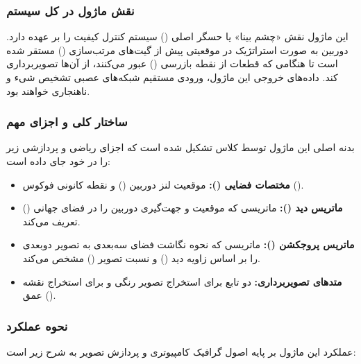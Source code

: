 \documentclass{article}
\begin{document}
\subsubsection{نقش ماژول در کل سیستم}
این ماژول نقش «چشم بینا» یا حسگر اصلی () سیستم کنترل کیفیت را بر عهده دارد. دوربین به صورت استراتژیک در موقعیتی پیش از گیت‌های مرتب‌سازی () مستقر شده است تا هنگامی که قطعات از نقطه بازرسی () عبور می‌کنند، از آن‌ها تصویربرداری کند. داده‌های خروجی این ماژول، ورودی مستقیم شبکه‌های عصبی تشخیص شیء و ناهنجاری خواهند بود.

\subsubsection{ساختار کلی و اجزای مهم}
بدنه اصلی این ماژول توسط کلاس  تشکیل شده است که اجزای ریاضی و پردازشی زیر را در خود جای داده است:

\begin{itemize}
	\item \textbf{مختصات فضایی ():} موقعیت لنز دوربین () و نقطه کانونی فوکوس ().
	\item \textbf{ماتریس دید ():} ماتریسی که موقعیت و جهت‌گیری دوربین را در فضای جهانی () تعریف می‌کند.
	\item \textbf{ماتریس پروجکشن ():} ماتریسی که نحوه نگاشت فضای سه‌بعدی به تصویر دوبعدی را بر اساس زاویه دید () و نسبت تصویر () مشخص می‌کند.
	\item \textbf{متدهای تصویربرداری:} دو تابع  برای استخراج تصویر رنگی و  برای استخراج نقشه عمق ().
\end{itemize}

\subsubsection{نحوه عملکرد}
عملکرد این ماژول بر پایه اصول گرافیک کامپیوتری و پردازش تصویر به شرح زیر است:
\end{document}
